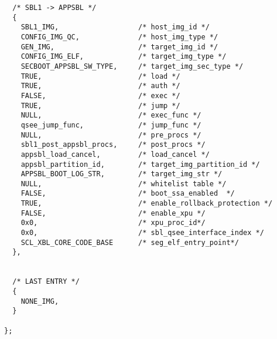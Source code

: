 \begin{lstlisting}
  /* SBL1 -> APPSBL */
  {
    SBL1_IMG,                   /* host_img_id */
    CONFIG_IMG_QC,              /* host_img_type */
    GEN_IMG,                    /* target_img_id */
    CONFIG_IMG_ELF,             /* target_img_type */
    SECBOOT_APPSBL_SW_TYPE,     /* target_img_sec_type */ 
    TRUE,                       /* load */
    TRUE,                       /* auth */
    FALSE,                      /* exec */
    TRUE,                       /* jump */
    NULL,                       /* exec_func */
    qsee_jump_func,             /* jump_func */
    NULL,                       /* pre_procs */ 
    sbl1_post_appsbl_procs,     /* post_procs */
    appsbl_load_cancel,         /* load_cancel */
    appsbl_partition_id,        /* target_img_partition_id */
    APPSBL_BOOT_LOG_STR,        /* target_img_str */
    NULL,                       /* whitelist table */
    FALSE,                      /* boot_ssa_enabled  */
    TRUE,                       /* enable_rollback_protection */
    FALSE,                      /* enable_xpu */
    0x0,                        /* xpu_proc_id*/   
    0x0,                        /* sbl_qsee_interface_index */
    SCL_XBL_CORE_CODE_BASE      /* seg_elf_entry_point*/
  },


  /* LAST ENTRY */
  {
    NONE_IMG,
  }

};


\end{lstlisting}


